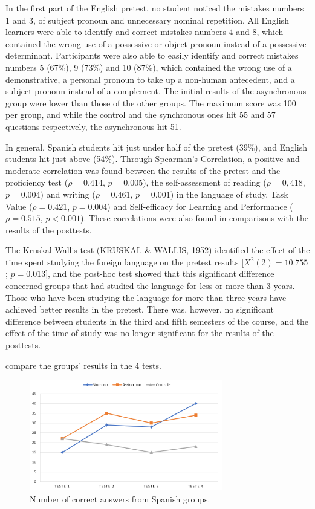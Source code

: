 \documentclass{textolivre}
\begin{document}
In the first part of the English pretest, no student noticed the
mistakes numbers 1 and 3, of subject pronoun and unnecessary nominal
repetition. All English learners were able to identify and correct
mistakes numbers 4 and 8, which contained the wrong use of a possessive
or object pronoun instead of a possessive determinant. Participants were
also able to easily identify and correct mistakes numbers 5 (67\%), 9
(73\%) and 10 (87\%), which contained the wrong use of a demonstrative,
a personal pronoun to take up a non-human antecedent, and a subject
pronoun instead of a complement. The initial results of the asynchronous
group were lower than those of the other groups. The maximum score was
100 per group, and while the control and the synchronous ones hit 55 and
57 questions respectively, the asynchronous hit 51.

In general, Spanish students hit just under half of the pretest (39\%),
and English students hit just above (54\%). Through Spearman's
Correlation, a positive and moderate correlation was found between the
results of the pretest and the proficiency test ($ρ = 0.414$, $p = 0.005$),
the self-assessment of reading ($ρ = 0,418$, $p = 0.004$) and writing 
($ρ = 0.461$, $p = 0.001$) in the language of study, Task Value ($ρ = 0.421$, $p = 0.004$)
and Self-efficacy for Learning and Performance ($ρ = 0.515$, $p < 0.001$). 
These correlations were also found in comparisons
with the results of the posttests.

The Kruskal-Wallis test (KRUSKAL \& WALLIS, 1952) identified the effect
of the time spent studying the foreign language on the pretest results
[$X^2(2) = 10.755$; $p = 0.013$], and the post-hoc test showed that this
significant difference concerned groups that had studied the language
for less or more than 3 years. Those who have been studying the language
for more than three years have achieved better results in the pretest.
There was, however, no significant difference between students in the
third and fifth semesters of the course, and the effect of the time of
study was no longer significant for the results of the posttests.

 compare the groups’ results in the 4 tests.

%
%
\begin{figure}[htbp]
 \centering
 \includegraphics[width=0.75\textwidth]{fig03.png}
 \caption{Number of correct answers from Spanish groups.}
 \label{fig03}
\end{figure}
\end{document}
